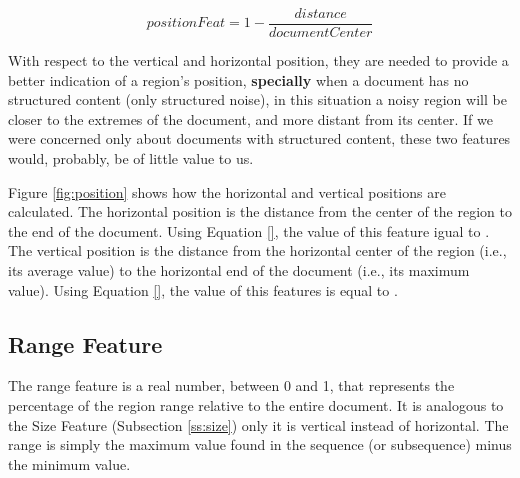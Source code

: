 \begin{equation}\label{eq:position}
    positionFeat = 1 - \frac{distance}{documentCenter}
\end{equation}

With respect to the vertical and horizontal position, they are needed to provide
a better indication of a region's position, \textbf{specially} when a document
has no structured content (only structured noise), in this situation a noisy region
will be closer to the extremes of the document, and more distant from its
center. If we were concerned only about documents with structured content, these
two features would, probably, be of little value to us. 

Figure \ref{fig:position} shows how the horizontal and vertical positions are
calculated. The horizontal position is the distance from the center of the
region to the end of the document. Using Equation \ref{}, the value of this
feature igual to $ $. The vertical position is the distance from the horizontal
center of the region (i.e., its average value) to the horizontal end of the
document (i.e., its maximum value). Using Equation \ref{}, the value of this
features is equal to $ $.

\subsection{Range Feature}\label{ss:range}
The range feature is a real number, between 0 and 1, that represents the
percentage of the region range relative to the entire document. It is analogous
to the Size Feature (Subsection \ref{ss:size}) only it is vertical instead of
horizontal. The range is simply the maximum value found in the sequence (or
subsequence) minus the minimum value.

